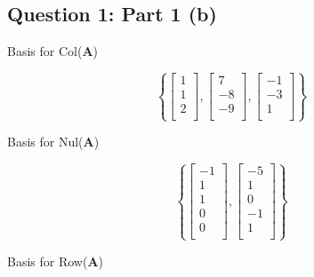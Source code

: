\documentclass{article}
\begin{document}
\subsection{Question 1: Part 1 (b)} 
Basis for Col($ \mathbf{A} $)

\[%
    \left\{
    \begin{bmatrix} 1\\1\\2\\ \end{bmatrix},
    \begin{bmatrix} 7\\-8\\-9\\ \end{bmatrix},
    \begin{bmatrix} -1\\-3\\1\\ \end{bmatrix}
    \right\}
\]%


Basis for Nul($ \mathbf{A} $)

\[%
    \left\{     
    \begin{bmatrix} 
        -1 \\
		1 \\
		1 \\
		0 \\
		0 \\		
    \end{bmatrix}
    ,
    \begin{bmatrix} 
        -5 \\
		1 \\
		0 \\
		-1 \\
		1 \\		
    \end{bmatrix}
    \right\}
\]%


Basis for Row($ \mathbf{A} $)
\end{document}
